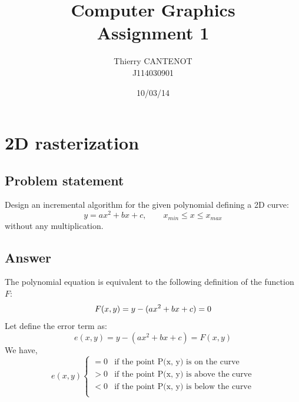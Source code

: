 \documentclass[a4paper,10pt]{article}
\title{\textbf{Computer Graphics} \\ Assignment 1}
\author{Thierry CANTENOT \\ J114030901}
\date{10/03/14}
\begin{document}
\maketitle

\section{2D rasterization}
\subsection{Problem statement}

Design an incremental algorithm for the given polynomial defining a 2D curve:
\begin{equation}
	y = ax^2 + bx + c, \qquad x_{min} \le x \le x_{max}
\end{equation}
without any multiplication.

\bigskip
\subsection{Answer}

The polynomial equation is equivalent to the following definition of the function $F$:
\begin{equation}
	F(x, y) = y - (ax^2 + bx + c) = 0 \\\\
\end{equation}
Let define the error term as:
\begin{equation}
	e(x, y) = y - (ax^2 + bx + c) = F(x, y)
\end{equation}
We have,
\begin{equation}
	e(x, y)
	\begin{cases}
	 = 0 & \text{if the point P(x, y) is on the curve} \\
	 > 0 & \text{if the point P(x, y) is above the curve} \\
	 < 0 & \text{if the point P(x, y) is below the curve} \\
	\end{cases}
\end{equation}
\end{document}
